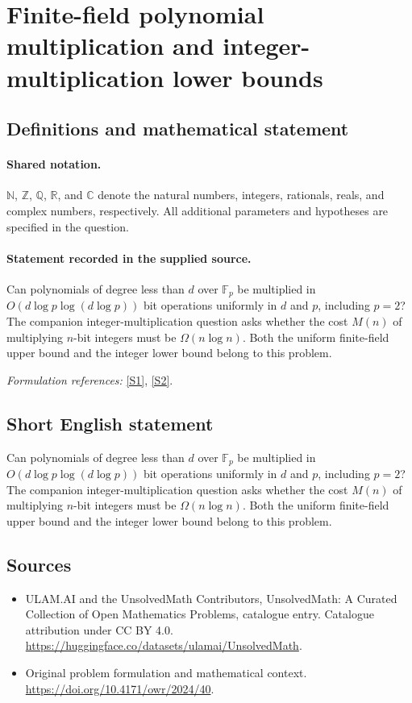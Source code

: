 \documentclass[11pt]{article}
\newcommand{\sref}[2]{\hyperlink{source:#1:#2}{[S#2]}}
\begin{document}
\section{Finite-field polynomial multiplication and integer-multiplication lower bounds}\label{statement}

\subsection{Definitions and mathematical statement}

\paragraph{Shared notation.}$\mathbb N$, $\mathbb Z$, $\mathbb Q$, $\mathbb R$, and $\mathbb C$ denote the natural numbers, integers, rationals, reals, and complex numbers, respectively. All additional parameters and hypotheses are specified in the question.


\paragraph{Statement recorded in the supplied source.}
Can polynomials of degree less than $d$ over $\mathbb F_p$ be multiplied in $O(d\log p\log(d\log p))$ bit operations uniformly in $d$ and $p$, including $p=2$? The companion integer-multiplication question asks whether the cost $M(n)$ of multiplying $n$-bit integers must be $\Omega(n\log n)$. Both the uniform finite-field upper bound and the integer lower bound belong to this problem.
\par\smallskip\textit{Formulation references:} \sref{statement}{1}, \sref{statement}{2}.
\subsection{Short English statement}
Can polynomials of degree less than $d$ over $\mathbb F_p$ be multiplied in $O(d\log p\log(d\log p))$ bit operations uniformly in $d$ and $p$, including $p=2$? The companion integer-multiplication question asks whether the cost $M(n)$ of multiplying $n$-bit integers must be $\Omega(n\log n)$. Both the uniform finite-field upper bound and the integer lower bound belong to this problem.
\subsection{Sources}
\begin{itemize}
\item[\hypertarget{source:statement:1}{S1}] ULAM.AI and the UnsolvedMath Contributors, UnsolvedMath: A Curated Collection of Open Mathematics Problems, catalogue entry. Catalogue attribution under CC BY 4.0.
\url{https://huggingface.co/datasets/ulamai/UnsolvedMath}.
\item[\hypertarget{source:statement:2}{S2}] Original problem formulation and mathematical context.
\url{https://doi.org/10.4171/owr/2024/40}.
\end{itemize}
\label{end:statement}
\end{document}

